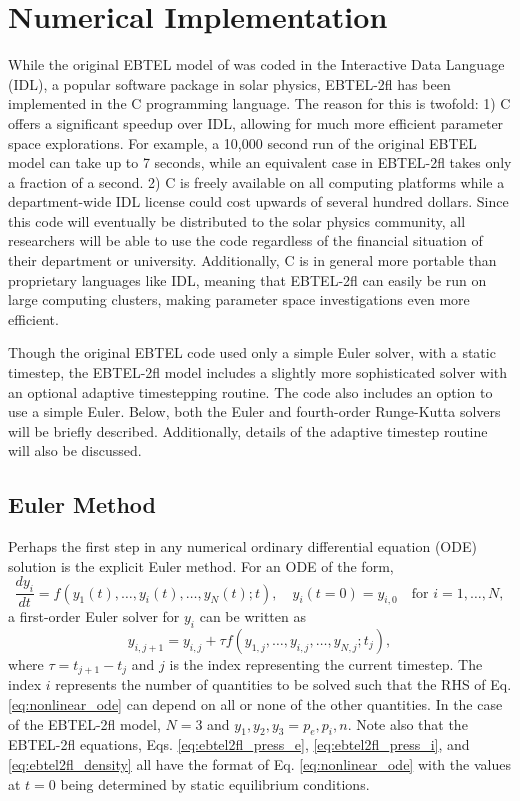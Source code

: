 \section{Numerical Implementation}
\label{sec:numerical}
%
\par While the original EBTEL model of \citet{klimchuk_highly_2008,cargill_enthalpy-based_2012} was coded in the Interactive Data Language (IDL), a popular software package in solar physics, EBTEL-2fl has been implemented in the C programming language. The reason for this is twofold: 1) C offers a significant speedup over IDL, allowing for much more efficient parameter space explorations. For example, a 10,000 second run of the original EBTEL model can take up to 7 seconds, while an equivalent case in EBTEL-2fl takes only a fraction of a second. 2) C is freely available on all computing platforms while a department-wide IDL license could cost upwards of several hundred dollars. Since this code will eventually be distributed to the solar physics community, all researchers will be able to use the code regardless of the financial situation of their department or university. Additionally, C is in general more portable than proprietary languages like IDL, meaning that EBTEL-2fl can easily be run on large computing clusters, making parameter space investigations even more efficient. 
%
\par Though the original EBTEL code used only a simple Euler solver, with a static timestep, the EBTEL-2fl model includes a slightly more sophisticated solver with an optional adaptive timestepping routine. The code also includes an option to use a simple Euler. Below, both the Euler and fourth-order Runge-Kutta solvers will be briefly described. Additionally, details of the adaptive timestep routine will also be discussed.
%
\subsection{Euler Method}
\label{subsec:euler}
%
\par Perhaps the first step in any numerical ordinary differential equation (ODE) solution is the explicit Euler method. For an ODE of the form,
\begin{equation}
	\label{eq:nonlinear_ode}
	\frac{d y_i}{dt} = f(y_1(t),\ldots,y_i(t),\ldots,y_N(t);t),\quad y_i(t=0)=y_{i,0}\quad \text{for }i=1,\ldots,N,
\end{equation}
a first-order Euler solver for $y_i$ can be written as
\begin{equation}
	\label{eq:euler}
	y_{i,j+1} = y_{i,j} + \tau f(y_{1,j},\ldots,y_{i,j},\ldots,y_{N,j};t_j),
\end{equation}
where $\tau=t_{j+1}-t_j$ and $j$ is the index representing the current timestep. The index $i$ represents the number of quantities to be solved such that the RHS of Eq. \ref{eq:nonlinear_ode} can depend on all or none of the other quantities. In the case of the EBTEL-2fl model, $N=3$ and $y_1,y_2,y_3=p_e,p_i,n$. Note also that the EBTEL-2fl equations, Eqs. \ref{eq:ebtel2fl_press_e}, \ref{eq:ebtel2fl_press_i}, and \ref{eq:ebtel2fl_density} all have the format of Eq. \ref{eq:nonlinear_ode} with the values at $t=0$ being determined by static equilibrium conditions. 
